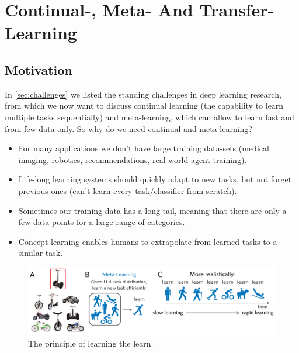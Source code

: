\documentclass[main]{subfiles}
\begin{document}
\newpage
\section{Continual-, Meta- And Transfer-Learning}

\subsection{Motivation}
In \cref{sec:challenges} we listed the standing challenges in deep learning research, from which we now want to discuss continual learning (the capability to learn multiple tasks sequentially) and meta-learning, which can allow to learn fast and from few-data only. So why do we need continual and meta-learning?
\begin{itemize}
    \item For many applications we don’t have large training data-sets (medical imaging, robotics, recommendations, real-world agent training).
    \item Life-long learning systems should quickly adapt to new tasks, but not forget previous ones (can’t learn every task/classifier from scratch).
    \item Sometimes our training data has a long-tail, meaning that there are only a few data points for a large range of categories.
    \item Concept learning enables humans to extrapolate from learned tasks to a similar task.
\end{itemize}

\begin{figure}[H]
    \centering
    \includegraphics[width=0.99\linewidth]{14_ContinualMetaAndTransferLearning/figures/metalearning.png}
    \caption{The principle of learning the learn.}
    \label{fig:my_label}
\end{figure}
\end{document}

